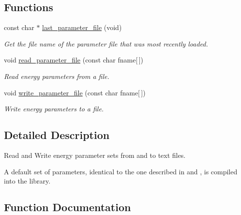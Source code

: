 \subsection*{Functions}
\begin{DoxyCompactItemize}
\item 
const char $\ast$ \hyperlink{group__energy__parameters__rw_ga5abafd7bad6d506e18bed13b18123cfe}{last\+\_\+parameter\+\_\+file} (void)
\begin{DoxyCompactList}\small\item\em Get the file name of the parameter file that was most recently loaded. \end{DoxyCompactList}\item 
void \hyperlink{group__energy__parameters__rw_ga165a142a3c68fb6655c69ef4ab7cd749}{read\+\_\+parameter\+\_\+file} (const char fname\mbox{[}$\,$\mbox{]})
\begin{DoxyCompactList}\small\item\em Read energy parameters from a file. \end{DoxyCompactList}\item 
void \hyperlink{group__energy__parameters__rw_ga8a43459be386a7489feeab68dc2c6c76}{write\+\_\+parameter\+\_\+file} (const char fname\mbox{[}$\,$\mbox{]})
\begin{DoxyCompactList}\small\item\em Write energy parameters to a file. \end{DoxyCompactList}\end{DoxyCompactItemize}


\subsection{Detailed Description}
Read and Write energy parameter sets from and to text files. 

A default set of parameters, identical to the one described in \cite{mathews:2004} and \cite{turner:2010}, is compiled into the library. 

\subsection{Function Documentation}
\mbox{\label{group__energy__parameters__rw_ga5abafd7bad6d506e18bed13b18123cfe}} 
